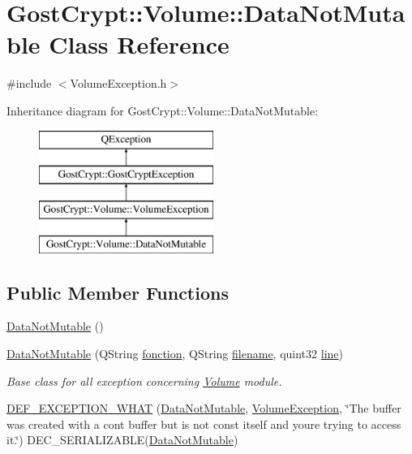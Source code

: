 \hypertarget{class_gost_crypt_1_1_volume_1_1_data_not_mutable}{}\section{Gost\+Crypt\+:\+:Volume\+:\+:Data\+Not\+Mutable Class Reference}
\label{class_gost_crypt_1_1_volume_1_1_data_not_mutable}


{\ttfamily \#include $<$Volume\+Exception.\+h$>$}

Inheritance diagram for Gost\+Crypt\+:\+:Volume\+:\+:Data\+Not\+Mutable\+:\begin{figure}[H]
\begin{center}
\leavevmode
\includegraphics[height=4.000000cm]{class_gost_crypt_1_1_volume_1_1_data_not_mutable}
\end{center}
\end{figure}
\subsection*{Public Member Functions}
\begin{DoxyCompactItemize}
\item 
\hyperlink{class_gost_crypt_1_1_volume_1_1_data_not_mutable_a92377b9acd0b11b76e6c9e6935d885b1}{Data\+Not\+Mutable} ()
\item 
\hyperlink{class_gost_crypt_1_1_volume_1_1_data_not_mutable_a092c3ae629d2c0068b32f8be92675c3b}{Data\+Not\+Mutable} (Q\+String \hyperlink{class_gost_crypt_1_1_gost_crypt_exception_a29b8c93d5efbb1ff369107385725a939}{fonction}, Q\+String \hyperlink{class_gost_crypt_1_1_gost_crypt_exception_a749a12375f4ba9d502623b99d8252f38}{filename}, quint32 \hyperlink{class_gost_crypt_1_1_gost_crypt_exception_abf506d911f12a4e969eea500f90bd32c}{line})
\begin{DoxyCompactList}\small\item\em Base class for all exception concerning \hyperlink{class_gost_crypt_1_1_volume_1_1_volume}{Volume} module. \end{DoxyCompactList}\item 
\hyperlink{class_gost_crypt_1_1_volume_1_1_data_not_mutable_a7a347731efbc8127c3da63c90f03b1d2}{D\+E\+F\+\_\+\+E\+X\+C\+E\+P\+T\+I\+O\+N\+\_\+\+W\+H\+AT} (\hyperlink{class_gost_crypt_1_1_volume_1_1_data_not_mutable}{Data\+Not\+Mutable}, \hyperlink{class_gost_crypt_1_1_volume_1_1_volume_exception}{Volume\+Exception}, \char`\"{}The buffer was created with a cont buffer but is not const itself and you\textquotesingle{}re trying to access it.\char`\"{}) D\+E\+C\+\_\+\+S\+E\+R\+I\+A\+L\+I\+Z\+A\+B\+LE(\hyperlink{class_gost_crypt_1_1_volume_1_1_data_not_mutable}{Data\+Not\+Mutable})
\end{DoxyCompactItemize}
